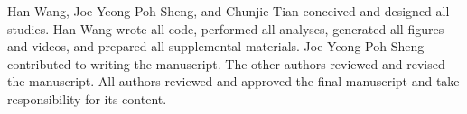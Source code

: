 Han Wang, Joe Yeong Poh Sheng, and Chunjie Tian conceived and designed all studies. Han Wang wrote all code, performed all analyses, generated all figures and videos, and prepared all supplemental materials. Joe Yeong Poh Sheng contributed to writing the manuscript. The other authors reviewed and revised the manuscript. All authors reviewed and approved the final manuscript and take responsibility for its content.
